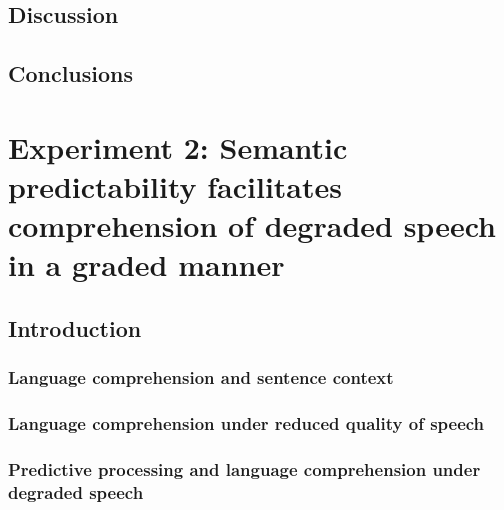 \documentclass[a4paper, nobind]{templates/ociamthesis}
\begin{document}
\hypertarget{discussion}{%
\section{Discussion}\label{discussion}}

\hypertarget{conclusions}{%
\section{Conclusions}\label{conclusions}}

\hypertarget{experiment-2-semantic-predictability-facilitates-comprehension-of-degraded-speech-in-a-graded-manner}{%
\chapter{Experiment 2: Semantic predictability facilitates comprehension of degraded speech in a graded manner}\label{experiment-2-semantic-predictability-facilitates-comprehension-of-degraded-speech-in-a-graded-manner}}

\minitoc

\hypertarget{introduction-1}{%
\section{Introduction}\label{introduction-1}}

\hypertarget{language-comprehension-and-sentence-context}{%
\subsection{Language comprehension and sentence context}\label{language-comprehension-and-sentence-context}}

\hypertarget{language-comprehension-under-reduced-quality-of-speech}{%
\subsection{Language comprehension under reduced quality of speech}\label{language-comprehension-under-reduced-quality-of-speech}}

\hypertarget{predictive-processing-and-language-comprehension-under-degraded-speech-1}{%
\subsection{Predictive processing and language comprehension under degraded speech}\label{predictive-processing-and-language-comprehension-under-degraded-speech-1}}
\end{document}
